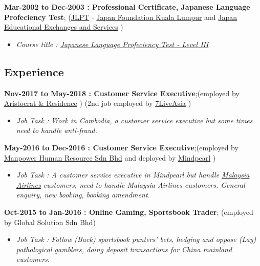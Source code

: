 \documentclass[]{article}
\providecommand{\tightlist}{%
  \setlength{\itemsep}{0pt}\setlength{\parskip}{0pt}}
\begin{document}
\textbf{Mar-2002 to Dec-2003 : Professional Certificate, Japanese
Language Profeciency Test}; (\href{http://www.jlpt.jp/index.html}{JLPT}
- \href{http://www.jfkl.org.my/}{Japan Foundation Kuala Lumpur} and
\href{http://www.jees.or.jp/index.htm}{Japan Educational Exchanges and
Services} )

\begin{itemize}
\tightlist
\item
  \emph{Course title :
  \href{https://raw.githubusercontent.com/scibrokes/owner/master/documents/JLPT\%20Certificate.jpg}{Japanese
  Language Profeciency Test - Level III}}
\end{itemize}

\subsection{Experience}\label{experience}

\textbf{Nov-2017 to May-2018 : Customer Service Executive};(employed by
\href{http://www.aristocrat-rh.com/}{Aristocrat \& Residence} ) (2nd job
employed by \href{https://www.7liveasia88.com}{7LiveAsia} )

\begin{itemize}
\tightlist
\item
  \emph{Job Task : Work in Cambodia, a customer service executive but
  some times need to handle anti-fraud.}
\end{itemize}

\textbf{May-2016 to Dec-2016 : Customer Service Executive};(employed by
\href{http://www.manpower.com.my/}{Manpower Human Resource Sdn Bhd} and
deployed by \href{https://www.mindpearl.com/}{Mindpearl} )

\begin{itemize}
\tightlist
\item
  \emph{Job Task : A customer service executive in Mindpearl but handle
  \href{https://www.malaysiaairlines.com/my/en.html}{Malaysia Airlines}
  customers, need to handle Malaysia Airlines customers. General
  enquiry, new booking, booking amendment.}
\end{itemize}

\textbf{Oct-2015 to Jan-2016 : Online Gaming, Sportsbook Trader};
(employed by Global Solution Sdn Bhd)

\begin{itemize}
\tightlist
\item
  \emph{Job Task : Follow (Back) sportsbook punters' bets, hedging and
  oppose (Lay) pathological gamblers, doing deposit transactions for
  China mainland customers.}
\end{itemize}
\end{document}
